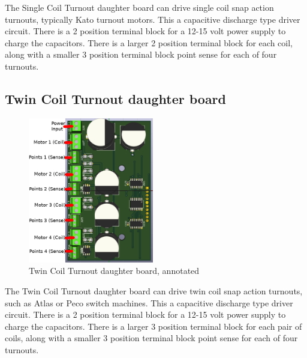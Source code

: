 The Single Coil Turnout daughter board can drive single coil snap action
turnouts, typically Kato turnout motors. This a capacitive discharge type
driver circuit. There is a 2 position terminal block for a 12-15 volt power
supply to charge the capacitors.  There is a larger 2 position terminal block 
for each coil, along with a smaller 3 position terminal block point sense for 
each of four turnouts.

\subsection{Twin Coil Turnout daughter board}
\label{sect:TC-Daughter}
\begin{figure}[hbpt]\begin{centering}%
\includegraphics[height=2.5in]{TC-DaughterBoard-Annotated.png}
\caption{Twin Coil Turnout daughter board, annotated}
\end{centering}\end{figure}                                                    
 
The Twin Coil Turnout daughter board can drive twin coil snap action turnouts,
such as Atlas or Peco switch machines. This a capacitive discharge type driver
circuit. There is a 2 position terminal block for a 12-15 volt power supply to
charge the capacitors. There is a larger 3 position terminal block for each
pair of coils, along with a smaller 3 position terminal block point sense for
each of four turnouts.

\clearpage
